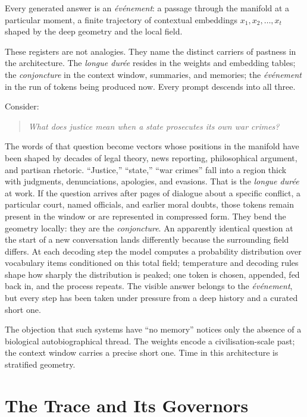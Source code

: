 \documentclass[12pt,a4paper]{article}
\begin{document}
Every generated answer is an \emph{\'ev\'enement}: a passage through the manifold at a particular moment, a finite trajectory of contextual embeddings $x_1, x_2, \dots, x_t$ shaped by the deep geometry and the local field.

These registers are not analogies. They name the distinct carriers of pastness in the architecture. The \emph{longue dur\'ee} resides in the weights and embedding tables; the \emph{conjoncture} in the context window, summaries, and memories; the \emph{\'ev\'enement} in the run of tokens being produced now. Every prompt descends into all three.

Consider:

\begin{quote}
\textit{What does justice mean when a state prosecutes its own war crimes?}
\end{quote}

The words of that question become vectors whose positions in the manifold have been shaped by decades of legal theory, news reporting, philosophical argument, and partisan rhetoric. ``Justice,'' ``state,'' ``war crimes'' fall into a region thick with judgments, denunciations, apologies, and evasions. That is the \emph{longue dur\'ee} at work. If the question arrives after pages of dialogue about a specific conflict, a particular court, named officials, and earlier moral doubts, those tokens remain present in the window or are represented in compressed form. They bend the geometry locally: they are the \emph{conjoncture}. An apparently identical question at the start of a new conversation lands differently because the surrounding field differs. At each decoding step the model computes a probability distribution over vocabulary items conditioned on this total field; temperature and decoding rules shape how sharply the distribution is peaked; one token is chosen, appended, fed back in, and the process repeats. The visible answer belongs to the \emph{\'ev\'enement}, but every step has been taken under pressure from a deep history and a curated short one.

The objection that such systems have ``no memory'' notices only the absence of a biological autobiographical thread. The weights encode a civilisation-scale past; the context window carries a precise short one. Time in this architecture is stratified geometry.

\section{The Trace and Its Governors}
\end{document}
